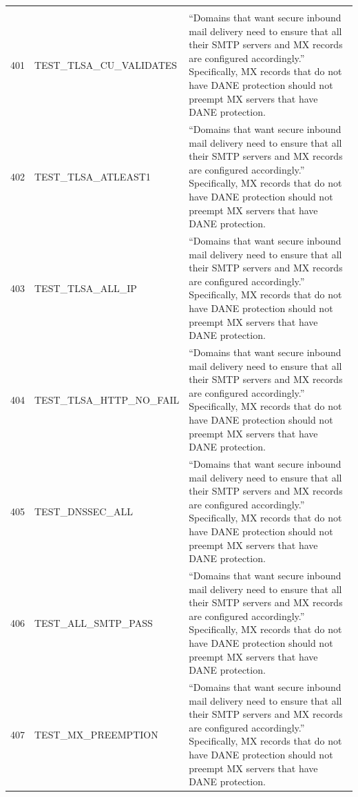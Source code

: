 \documentclass[preprint,3p]{elsarticle}
\begin{document}
\begin{center}
\begin{longtable}{>{\small}l>{\small}l>{\small}p{3.25in}}
\\
\multicolumn{3}{c}{\textbf{\large 401-407: Ensemble results}}\\
401 & TEST\_TLSA\_CU\_VALIDATES &  ``Domains that want secure inbound mail delivery need to ensure that all their SMTP servers and MX records are configured accordingly.'' Specifically, MX records that do not have DANE protection should not preempt MX servers that have DANE protection.\\
402 & TEST\_TLSA\_ATLEAST1   &  ``Domains that want secure inbound mail delivery need to ensure that all their SMTP servers and MX records are configured accordingly.'' Specifically, MX records that do not have DANE protection should not preempt MX servers that have DANE protection.\\
403 & TEST\_TLSA\_ALL\_IP     &  ``Domains that want secure inbound mail delivery need to ensure that all their SMTP servers and MX records are configured accordingly.'' Specifically, MX records that do not have DANE protection should not preempt MX servers that have DANE protection.\\
404 & TEST\_TLSA\_HTTP\_NO\_FAIL &  ``Domains that want secure inbound mail delivery need to ensure that all their SMTP servers and MX records are configured accordingly.'' Specifically, MX records that do not have DANE protection should not preempt MX servers that have DANE protection.\\
405 & TEST\_DNSSEC\_ALL      &  ``Domains that want secure inbound mail delivery need to ensure that all their SMTP servers and MX records are configured accordingly.'' Specifically, MX records that do not have DANE protection should not preempt MX servers that have DANE protection.\\
406 & TEST\_ALL\_SMTP\_PASS   &  ``Domains that want secure inbound mail delivery need to ensure that all their SMTP servers and MX records are configured accordingly.'' Specifically, MX records that do not have DANE protection should not preempt MX servers that have DANE protection.\\
407 & TEST\_MX\_PREEMPTION   &  ``Domains that want secure inbound mail delivery need to ensure that all their SMTP servers and MX records are configured accordingly.'' Specifically, MX records that do not have DANE protection should not preempt MX servers that have DANE protection.\\
\end{longtable}
\end{center}
\end{document}
